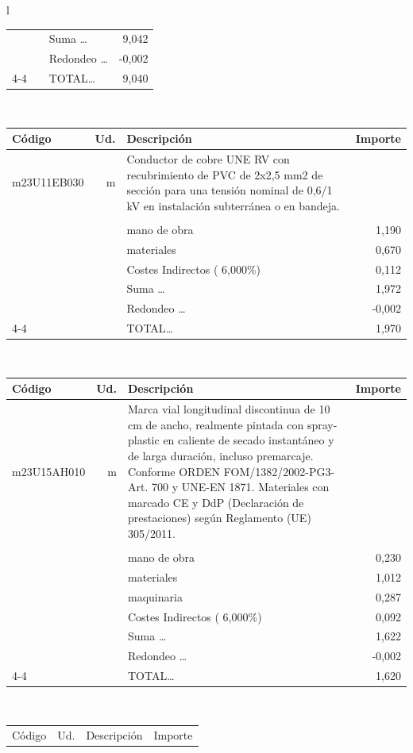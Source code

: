 \documentclass{book}%
\begin{document}
\begin{longtable}{l}
\begin{tabular}{l r p{60mm} r}
&&Suma \ldots&     9,042\\%
&&Redondeo \ldots&    {-}0,002\\%
\cline{4-4}%
&&TOTAL\ldots&     9,040\\%
\end{tabular}\\%
\begin{tabular}{l r p{60mm} r}%
Código&Ud.&Descripción&Importe\\%
\hline%
m23U11EB030&m&Conductor de cobre UNE RV con recubrimiento de PVC de 2x2,5 mm2 de sección para una tensión nominal de 0,6/1 kV en instalación subterránea o en bandeja.&\\%
&&&\\%
&&mano de obra&     1,190\\%
&&materiales&     0,670\\%
&&Costes Indirectos (     6,000\%)&     0,112\\%
&&Suma \ldots&     1,972\\%
&&Redondeo \ldots&    {-}0,002\\%
\cline{4-4}%
&&TOTAL\ldots&     1,970\\%
\end{tabular}\\%
\begin{tabular}{l r p{60mm} r}%
Código&Ud.&Descripción&Importe\\%
\hline%
m23U15AH010&m&Marca vial longitudinal discontinua de 10 cm de ancho, realmente pintada con spray{-}plastic en caliente de secado instantáneo y de larga duración, incluso premarcaje. Conforme ORDEN FOM/1382/2002{-}PG3{-}Art. 700 y UNE{-}EN 1871. Materiales con marcado CE y DdP (Declaración de prestaciones) según Reglamento (UE) 305/2011.&\\%
&&&\\%
&&mano de obra&     0,230\\%
&&materiales&     1,012\\%
&&maquinaria&     0,287\\%
&&Costes Indirectos (     6,000\%)&     0,092\\%
&&Suma \ldots&     1,622\\%
&&Redondeo \ldots&    {-}0,002\\%
\cline{4-4}%
&&TOTAL\ldots&     1,620\\%
\end{tabular}\\%
\begin{tabular}{l r p{60mm} r}%
Código&Ud.&Descripción&Importe\\%

\end{tabular}
\end{longtable}
\end{document}
